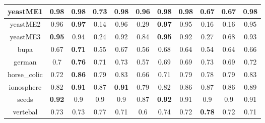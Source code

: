 \documentclass{article}%
\begin{document}
\begin{tabular}{c|cccccccccc}
\hline%
yeastME1&\textbf{0.98}&\textbf{0.98}&0.73&\textbf{0.98}&0.96&\textbf{0.98}&\textbf{0.98}&0.67&0.67&\textbf{0.98}\\%
\hline%
yeastME2&0.96&\textbf{0.97}&0.14&0.96&0.29&\textbf{0.97}&0.95&0.16&0.16&0.95\\%
\hline%
yeastME3&\textbf{0.95}&0.94&0.24&0.92&0.84&\textbf{0.95}&0.92&0.27&0.68&0.93\\%
\hline%
bupa&0.67&\textbf{0.71}&0.55&0.67&0.56&0.68&0.64&0.54&0.64&0.66\\%
\hline%
german&0.7&\textbf{0.76}&0.71&0.73&0.57&0.69&0.69&0.73&0.69&0.72\\%
\hline%
horse\_colic&0.72&\textbf{0.86}&0.79&0.83&0.66&0.71&0.79&0.78&0.79&0.83\\%
\hline%
ionosphere&0.82&\textbf{0.91}&0.87&\textbf{0.91}&0.79&0.82&0.86&0.87&0.86&0.89\\%
\hline%
seeds&\textbf{0.92}&0.9&0.9&0.9&0.87&\textbf{0.92}&0.91&0.9&0.9&0.91\\%
\hline%
vertebal&0.73&0.73&0.77&0.71&0.6&0.74&0.72&\textbf{0.78}&0.72&0.71\\%
\hline%
\end{tabular}

%
\end{document}
